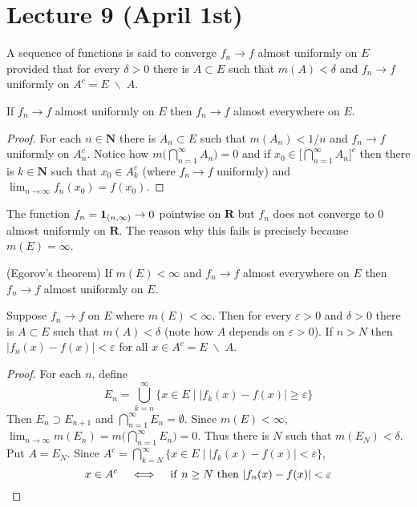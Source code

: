 \section{Lecture 9 (April 1st)}
\begin{defi}
A sequence of functions is said to converge $f_{n}\rightarrow f$ almost uniformly on $E$ provided that for every $\delta  >0$ there is $A\subset E$ such that $m(A)<\delta $ and $f_{n}\rightarrow f$ uniformly on $A^{c}=E\;\backslash\;A$.
\end{defi}
\vspace{2ex}
\begin{thm}
If $f_{n}\rightarrow f$ almost uniformly on $E$ then $f_{n}\rightarrow f$ almost everywhere on $E$.
\end{thm}
\vspace{2ex}
\begin{proof}
For each $n\in {\bm N}$ there is $A_{n}\subset E$ such that $m(A_{n})<1/n$ and $f_{n}\rightarrow f$ uniformly on $A_{n}^{c}$. Notice how $m\Big(\bigcap _{n=1}^{\infty }A_{n}\Big)=0$ and if $x_{0}\in \Big[\bigcap ^{\infty }_{n=1}A_{n}\Big]^{c}$ then there is $k\in {\bm N}$ such that $x_{0}\in A_{k}^{c}$ (where $f_{n}\rightarrow f$ uniformly) and $\lim _{n\rightarrow \infty }f_{n}(x_0)=f(x_0)$.
\end{proof}
\vspace{2ex}
\begin{ex}
The function $f_{n}={\bf 1}_{(n,\infty )}\rightarrow 0$ pointwise on ${\bm R}$ but $f_{n}$ does not converge to 0 almost uniformly on ${\bm R}$. The reason why this fails is precisely because $m(E)=\infty $.
\end{ex}
\vspace{2ex}
\begin{thm}
(Egorov's theorem) If $m(E)<\infty $ and $f_{n}\rightarrow f$ almost everywhere on $E$ then $f_{n}\rightarrow f$ almost uniformly on $E$. 
\end{thm}
\vspace{2ex}
\begin{lem}
Suppose $f_{n}\rightarrow f$ on $E$ where $m(E)<\infty $. Then for every $\varepsilon >0$ and $\delta >0$ there is $A\subset E$ such that $m(A)<\delta $ (note how $A$ depends on $\varepsilon >0$). If $n>N$ then $|f_{n}(x)-f(x)|<\varepsilon$ for all $x\in A^{c}=E\;\backslash\;A$. 
\end{lem}
\vspace{2ex}
\begin{proof}
For each $n$, define
\[E_{n}=\bigcup ^{\infty }_{k=n}\{x\in E \;|\; |f_{k}(x)-f(x)|\geq \varepsilon \}\]
Then $E_{n}\supset E_{n+1}$ and $\bigcap ^{\infty }_{n=1}E_{n}=\emptyset$. Since $m(E)<\infty $, $\lim_{n\rightarrow \infty }m(E_{n})=m\Big(\bigcap ^{\infty }_{n=1}E_{n}\Big)=0$. Thus there is $N$ such that $m(E_{N})<\delta $. Put $A=E_{N}$. Since $A^{c}=\bigcap ^{\infty }_{k=N}\{x\in E \;|\; |f_{k}(x)-f(x)|<\varepsilon \}$, 
\[x\in A^{c}\hspace{2ex}\iff\hspace{2ex}\mathrm{if\ }n\geq N\mathrm{\ then\ }|f_{n}(x)-f(x)|<\varepsilon  \]
\end{proof}
